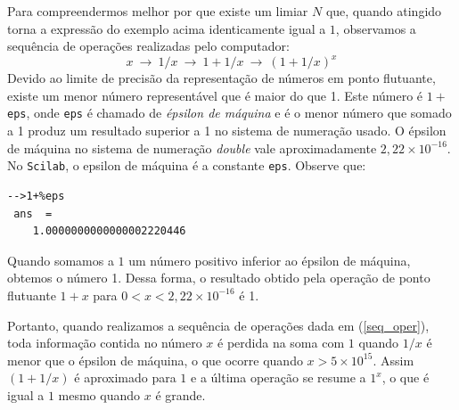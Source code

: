 Para compreendermos melhor por que existe um limiar $N$ que, quando atingido torna a expressão do exemplo acima identicamente igual a $1$, observamos a sequência de operações realizadas pelo computador:
\begin{equation}\label{seq_oper}
x~\to ~1/x ~\to ~1+1/x ~\to ~(1+1/x)^x
\end{equation}
Devido ao limite de precisão da representação de números em ponto flutuante, existe um menor número representável que é maior do que 1. Este número é $1 + $\verb+eps+, onde \verb+eps+ é chamado de \emph{épsilon de máquina} e é o menor número que somado a 1 produz um resultado superior a 1 no sistema de numeração usado. O épsilon de máquina no sistema de numeração \emph{double} vale aproximadamente $2,22\times 10^{-16}$.
\ifisscilab
No \verb+Scilab+, o epsilon de máquina é a constante \verb+eps+. Observe que:
\begin{verbatim}
-->1+%eps
 ans  =
    1.0000000000000002220446 
\end{verbatim}
\fi
Quando somamos a $1$ um número positivo inferior ao épsilon de máquina, obtemos o número 1. Dessa forma, o resultado obtido pela operação de ponto flutuante $1+x$ para $0<x<2,22 \times 10^{-16}$ é 1. 

Portanto, quando realizamos a sequência de operações dada em (\ref{seq_oper}), toda informação contida no número $x$ é perdida na soma com $1$ quando $1/x$ é menor que o épsilon de máquina, o que ocorre quando $x>5\times 10^{15}$. Assim $(1+1/x)$ é aproximado para $1$ e a última operação se resume a $1^x$, o que é igual a $1$ mesmo quando $x$ é grande.

